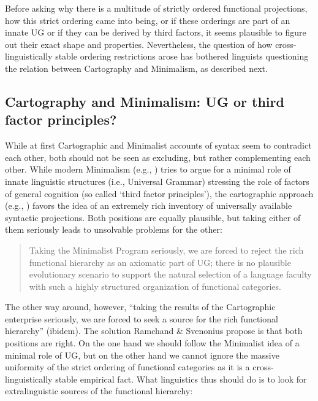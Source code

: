 \noindent Before asking why there is a multitude of strictly ordered functional projections, how this strict ordering came into being, or if these orderings are part of an innate UG or if they can be derived by third factors, it seems plausible to figure out their exact shape and properties. Nevertheless, the question of how cross-linguistically stable ordering restrictions arose has bothered linguists questioning the relation between Cartography and Minimalism, as described next.

\subsection{Cartography and Minimalism: UG or third factor principles?}
\noindent While at first Cartographic and Minimalist accounts of syntax seem to contradict each other, both should not be seen as excluding, but rather complementing each other. While modern Minimalism (e.g., \citealt{chomsky2005three}) tries to argue for a minimal role of innate linguistic structures (i.e., Universal Grammar) stressing the role of factors of general cognition (so called `third factor principles'), the cartographic approach (e.g., \citealt{cinque1999adverbs}) favors the idea of an extremely rich inventory of universally available syntactic projections. Both positions are equally plausible, but taking either of them seriously leads to unsolvable problems for the other:

\begin{quote}
Taking the Minimalist Program seriously, we are forced to reject the rich functional hierarchy as an axiomatic part of UG; there is no plausible evolutionary scenario to support the natural selection of a language faculty with such a highly structured organization of functional categories. \citep[172]{ramchand2014deriving}
\end{quote}

\noindent The other way around, however, ``taking the results of the Cartographic enterprise seriously, we are forced to seek a source for the rich functional hierarchy'' (ibidem). The solution Ramchand \& Svenonius propose is that both positions are right. On the one hand we should follow the Minimalist idea of a minimal role of UG, but on the other hand we cannot ignore the massive uniformity of the strict ordering of functional categories as it is a cross-linguistically stable empirical fact. What linguistics thus should do is to look for extralinguistic sources of the functional hierarchy:

